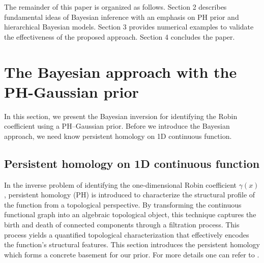 \documentclass{ws-mplb}
\begin{document}
The remainder of this paper is organized as follows. Section 2 describes fundamental ideas of Bayesian inference with an emphasis on PH prior and hierarchical Bayesian models. Section 3 provides numerical examples to validate the effectiveness of the proposed approach. Section 4 concludes the paper.


\section{The Bayesian approach with the PH-Gaussian prior }\label{s:2}


In this section, we present the Bayesian inversion for identifying the Robin coefficient using a PH–Gaussian prior. Before we introduce the Bayesian approach, we need know  persistent homology on 1D continuous function.


\subsection{Persistent homology on 1D continuous function}

In the inverse problem of identifying the one-dimensional Robin coefficient $\gamma(x)$, persistent homology (PH) is introduced to characterize the structural profile of the function from a topological perspective. By transforming the continuous functional graph into an algebraic topological object, this technique captures the birth and death of connected components through a filtration process.  This process yields a quantified topological characterization that effectively encodes the function's structural features.
This section introduces the persistent homology which forms a concrete basement for
our prior. For more details one can refer to \cite{Edelsbrunner2014, Kaczynski2004, Miller2021, Zheng2015, Zomorodian2005}.


\end{document}
